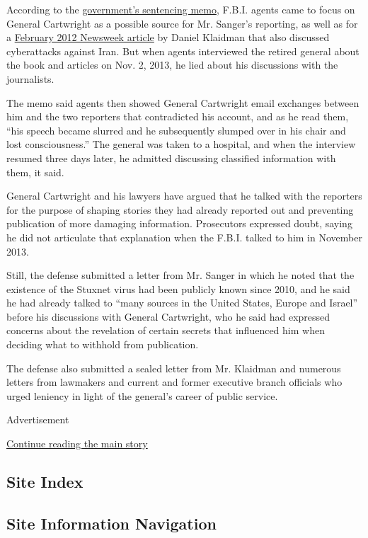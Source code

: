 According to the
\href{https://www.documentcloud.org/documents/3260025-Cartwright-Government-Sentencing.html}{government's
sentencing memo}, F.B.I. agents came to focus on General Cartwright as a
possible source for Mr. Sanger's reporting, as well as for a
\href{http://www.newsweek.com/obamas-dangerous-game-iran-65711}{February
2012 Newsweek article} by Daniel Klaidman that also discussed
cyberattacks against Iran. But when agents interviewed the retired
general about the book and articles on Nov. 2, 2013, he lied about his
discussions with the journalists.

The memo said agents then showed General Cartwright email exchanges
between him and the two reporters that contradicted his account, and as
he read them, ``his speech became slurred and he subsequently slumped
over in his chair and lost consciousness.'' The general was taken to a
hospital, and when the interview resumed three days later, he admitted
discussing classified information with them, it said.

General Cartwright and his lawyers have argued that he talked with the
reporters for the purpose of shaping stories they had already reported
out and preventing publication of more damaging information. Prosecutors
expressed doubt, saying he did not articulate that explanation when the
F.B.I. talked to him in November 2013.

Still, the defense submitted a letter from Mr. Sanger in which he noted
that the existence of the Stuxnet virus had been publicly known since
2010, and he said he had already talked to ``many sources in the United
States, Europe and Israel'' before his discussions with General
Cartwright, who he said had expressed concerns about the revelation of
certain secrets that influenced him when deciding what to withhold from
publication.

The defense also submitted a sealed letter from Mr. Klaidman and
numerous letters from lawmakers and current and former executive branch
officials who urged leniency in light of the general's career of public
service.

Advertisement

\protect\hyperlink{after-bottom}{Continue reading the main story}

\hypertarget{site-index}{%
\subsection{Site Index}\label{site-index}}

\hypertarget{site-information-navigation}{%
\subsection{Site Information
Navigation}\label{site-information-navigation}}

